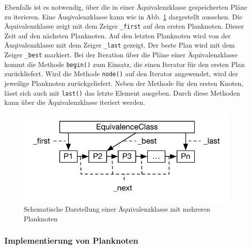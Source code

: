 Ebenfalls ist es notwendig, über die in einer Äquivalenzklasse gespeicherten Pläne zu iterieren. Eine Äuqivalenzklasse kann wie in Abb. \ref{EquivalenceClassList} dargestellt aussehen. Die Äquivalenzklasse zeigt mit dem Zeiger \texttt{\_first} auf den ersten Planknoten. Dieser Zeit auf den nächsten Planknoten. Auf den letzten Planknoten wird von der Äuqivalenzklasse mit dem Zeiger \texttt{\_last} gezeigt. Der beste Plan wird mit dem Zeiger \texttt{\_best} markiert. Bei der Iteration über die Pläne einer Äquivalenzklasse kommt die Methode \texttt{begin()} zum Einsatz, die einen Iterator für den ersten Plan zurückliefert. Wird die Methode \texttt{node()} auf den Iterator angewendet, wird der jeweilige Planknoten zurückgeliefert. Neben der Methode für den ersten Knoten, lässt sich auch mit \texttt{last()} das letzte Element ausgeben. Durch diese Methoden kann über die Äquivalenzklasse iteriert werden.

\begin{figure}[ht]
  \centering
  \includegraphics{04_Implementierung/00_media/EquivalenceClassList.pdf}
  \caption{Schematische Darstellung einer Äquivalenzklasse mit mehreren Planknoten}
  \label{EquivalenceClassList}
\end{figure}


\subsubsection{Implementierung von Planknoten}

